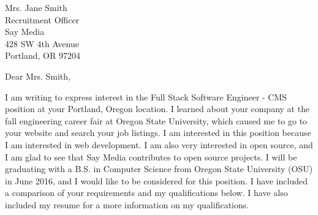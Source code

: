 \documentclass[11pt]{letter} %
\begin{document}

\begin{letter}{Mrs. Jane Smith \\
Recruitment Officer \\
Say Media \\
428 SW 4th Avenue \\
Portland, OR 97204} 



\signature{Megan Goossens} %


\opening{Dear Mrs. Smith,} 
 
I am writing to express interest in the Full Stack Software Engineer - CMS
position at your Portland, Oregon location. I learned about your company at the
fall engineering career fair at Oregon State University, which caused me to go
to your website and search your job listings. I am interested in this position
because I am interested in web development. I am also very interested in open
source, and I am glad to see that Say Media contributes to open source projects.
I will be graduating with a B.S. in Computer Science from Oregon State
University (OSU) in June 2016, and I would like to be considered for this
position. I have included a comparison of your requirements and my
qualifications below. I have also included my resume for a more information on
my qualifications.


\end{letter}
\end{document}
